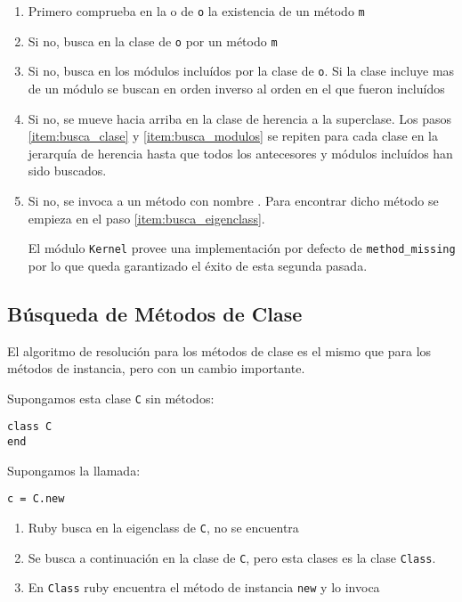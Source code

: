 \begin{enumerate}

\item
\label{item:busca_eigenclass}
Primero comprueba en la  o  de \verb|o| la existencia de un método \verb|m|
 
\item
\label{item:busca_clase}
Si no, busca en la clase de \verb|o| por un método \verb|m|

\item
\label{item:busca_modulos}
Si no, busca en los módulos incluídos por la clase de \verb|o|.
Si la clase incluye mas de un módulo se buscan en orden inverso al orden en el que fueron incluídos

\item
Si no, se mueve hacia arriba en la clase de herencia a la superclase.
Los pasos
\ref{item:busca_clase}
y
\ref{item:busca_modulos}
se repiten para cada clase en la jerarquía de herencia hasta que todos los 
antecesores y módulos incluídos han sido buscados.

\item
Si no, se invoca a un método con nombre .
Para encontrar dicho método se empieza en el paso
\ref{item:busca_eigenclass}.

El módulo \verb|Kernel| provee una implementación por defecto de
\verb|method_missing| por lo que queda garantizado 
el éxito de esta segunda pasada.
\end{enumerate}

  \subsection{Búsqueda de Métodos de Clase}
\label{subsection:busqueda_de_metodos_de_clase}

El algoritmo de resolución para los métodos de clase es el mismo 
que para los métodos de instancia, pero con un cambio importante.

Supongamos esta clase \verb|C| sin métodos:
\begin{verbatim}
class C
end
\end{verbatim}

Supongamos la llamada:
\begin{verbatim}
c = C.new
\end{verbatim}

\begin{enumerate}
\item Ruby busca en la eigenclass de \verb|C|, no se encuentra
\item
Se busca a continuación en la clase de \verb|C|, pero esta clases es la clase \verb|Class|.

\item
En \verb|Class| ruby encuentra el método de instancia \verb|new| y lo invoca
\end{enumerate}

